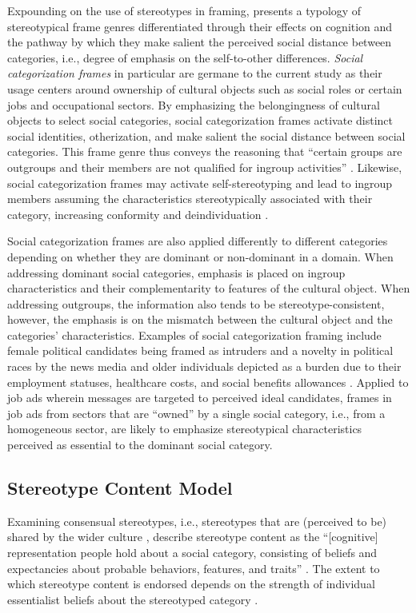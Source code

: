 \documentclass[man]{apa7}
\begin{document}
Expounding on the use of stereotypes in framing, \parencite{Yang2015a} presents a typology of stereotypical frame genres differentiated through their effects on cognition and the pathway by which they make salient the perceived social distance between categories, i.e., degree of emphasis on the self-to-other differences. \textit{Social categorization frames} in particular are germane to the current study as their usage centers around ownership of cultural objects such as social roles or certain jobs and occupational sectors. By emphasizing the belongingness of cultural objects to select social categories, social categorization frames activate distinct social identities, otherization, and make salient the social distance between social categories. This frame genre thus conveys the reasoning that “certain groups are outgroups and their members are not qualified for ingroup activities” \parencite[p. 261]{Yang2015a}. Likewise, social categorization frames may activate self-stereotyping and lead to ingroup members assuming the characteristics stereotypically associated with their category, increasing conformity and deindividuation \parencite{brown2003BlackwellHandbookSocial}.

Social categorization frames are also applied differently to different categories depending on whether they are dominant or non-dominant in a domain. When addressing dominant social categories, emphasis is placed on ingroup characteristics and their complementarity to features of the cultural object. When addressing outgroups, the information also tends to be stereotype-consistent, however, the emphasis is on the mismatch between the cultural object and the categories’ characteristics. Examples of social categorization framing include female political candidates being framed as intruders and a novelty in political races by the news media \parencite{meeks_all_2013, sullivan_1984_1989} and older individuals depicted as a burden due to their employment statuses, healthcare costs, and social benefits allowances \parencite{ng_evaluating_2012}. Applied to job ads wherein messages are targeted to perceived ideal candidates, frames in job ads from sectors that are “owned” by a single social category, i.e., from a homogeneous sector, are likely to emphasize stereotypical characteristics perceived as essential to the dominant social category.

\subsection{Stereotype Content Model }
\label{scm}
Examining consensual stereotypes, i.e., stereotypes that are (perceived to be) shared by the wider culture \parencite{fiske_prejudices_2017, gardner1994}, \Textcite{beukeboom_how_2019} describe stereotype content as the “[cognitive] representation people hold about a social category, consisting of beliefs and expectancies about probable behaviors, features, and traits” . The extent to which stereotype content is endorsed depends on the strength of individual essentialist beliefs about the stereotyped category \parencite[for perceived category essentialism and stereotyping, see][]{beukeboom_how_2019}.
\end{document}
